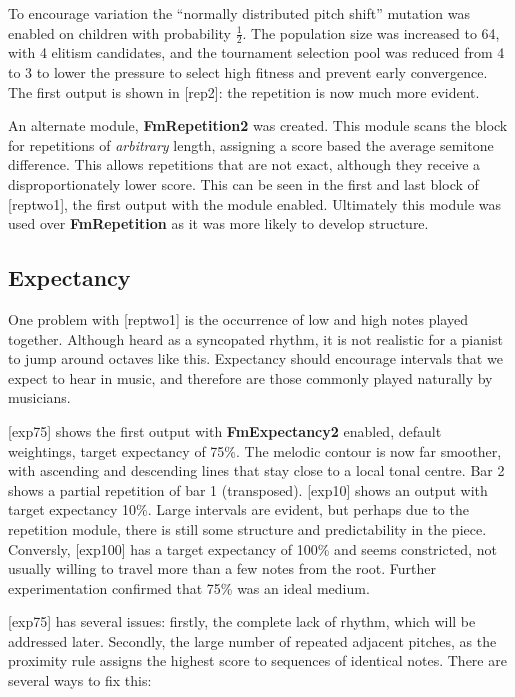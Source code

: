 To encourage variation the ``normally distributed pitch shift'' mutation was enabled on children with probability $\frac{1}{2}$. The population size was increased to 64, with 4 elitism candidates, and the tournament selection pool was reduced from 4 to 3 to lower the pressure to select high fitness and prevent early convergence. The first output is shown in [rep2]: the repetition is now much more evident.

An alternate module, \textbf{FmRepetition2} was created. This module scans the block for repetitions of \emph{arbitrary} length, assigning a score based the average semitone difference. This allows repetitions that are not exact, although they receive a disproportionately lower score. This can be seen in the first and last block of [reptwo1], the first output with the module enabled. Ultimately this module was used over \textbf{FmRepetition} as it was more likely to develop structure.

\subsection{Expectancy}

One problem with [reptwo1] is the occurrence of low and high notes played together. Although heard as a syncopated rhythm, it is not realistic for a pianist to jump around octaves like this. Expectancy should encourage intervals that we expect to hear in music, and therefore are those commonly played naturally by musicians.

[exp75] shows the first output with \textbf{FmExpectancy2} enabled, default weightings, target expectancy of 75\%. The melodic contour is now far smoother, with ascending and descending lines that stay close to a local tonal centre. Bar 2 shows a partial repetition of bar 1 (transposed). [exp10] shows an output with target expectancy 10\%. Large intervals are evident, but perhaps due to the repetition module, there is still some structure and predictability in the piece. Conversly, [exp100] has a target expectancy of 100\% and seems constricted, not usually willing to travel more than a few notes from the root. Further experimentation confirmed that 75\% was an ideal medium.

[exp75] has several issues: firstly, the complete lack of rhythm, which will be addressed later. Secondly, the large number of repeated adjacent pitches, as the proximity rule assigns the highest score to sequences of identical notes. There are several ways to fix this:

